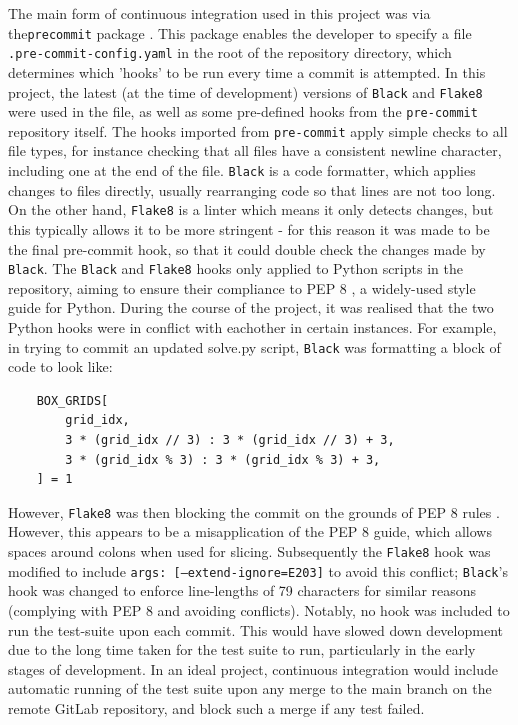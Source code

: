 \documentclass[12pt]{article}
\begin{document}
The main form of continuous integration used in this project was via the\texttt{pre\-commit} package \cite{precommit}.
This package enables the developer to specify a file \texttt{.pre-commit-config.yaml} in the root of the repository directory, which determines which 'hooks' to be run every time a commit is attempted.
In this project, the latest (at the time of development) versions of \texttt{Black} \cite{black} and \texttt{Flake8} \cite{flake8} were used in the file, as well as some pre-defined hooks from the \texttt{pre-commit} repository itself.
The hooks imported from \texttt{pre-commit} apply simple checks to all file types, for instance checking that all files have a consistent newline character, including one at the end of the file.
\texttt{Black} is a code formatter, which applies changes to files directly, usually rearranging code so that lines are not too long.
On the other hand, \texttt{Flake8} is a linter which means it only detects changes, but this typically allows it to be more stringent - for this reason it was made to be the final pre-commit hook, so that it could double check the changes made by \texttt{Black}.
The \texttt{Black} and \texttt{Flake8} hooks only applied to Python scripts in the repository, aiming to ensure their compliance to PEP 8 \cite{pep8}, a widely-used style guide for Python.
During the course of the project, it was realised that the two Python hooks were in conflict with eachother in certain instances.
For example, in trying to commit an updated solve.py script, \texttt{Black} was formatting a block of code to look like:
\begin{lstlisting}
    BOX_GRIDS[
        grid_idx,
        3 * (grid_idx // 3) : 3 * (grid_idx // 3) + 3,
        3 * (grid_idx % 3) : 3 * (grid_idx % 3) + 3,
    ] = 1
\end{lstlisting}
However, \texttt{Flake8} was then blocking the commit on the grounds of PEP 8 rules \cite{wspace}. However, this appears to be a misapplication of the PEP 8 guide, which allows spaces around colons when used for slicing.
Subsequently the \texttt{Flake8} hook was modified to include \texttt{args: [--extend-ignore=E203]} to avoid this conflict; \texttt{Black}'s hook was changed to enforce line-lengths of 79 characters for similar reasons (complying with PEP 8 and avoiding conflicts).
Notably, no hook was included to run the test-suite upon each commit.
This would have slowed down development due to the long time taken for the test suite to run, particularly in the early stages of development.
In an ideal project, continuous integration would include automatic running of the test suite upon any merge to the main branch on the remote GitLab repository, and block such a merge if any test failed.
\end{document}
